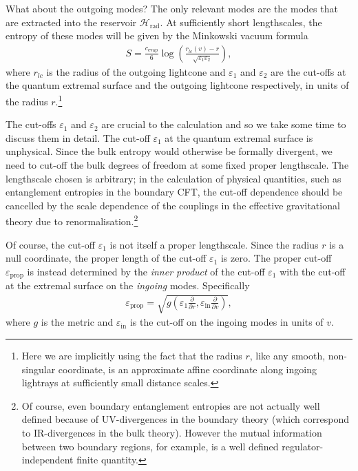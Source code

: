 \documentclass[12pt]{article}
\begin{document}
What about the outgoing modes? The only relevant modes are the modes that are extracted into the reservoir $\mathcal{H}_\text{rad}$. At sufficiently short lengthscales, the entropy of these modes will be given by the Minkowski vacuum formula \cite{calabrese2004entanglement, calabrese2009entanglement}
\begin{align} \label{eq:bulkentropyoutgoing}
S = \frac{c_\text{evap}}{6}\log\left(\frac{r_{lc}(v) - r}{\sqrt{\varepsilon_1 \varepsilon_2}}\right),
\end{align}
where $r_{lc}$ is the radius of the outgoing lightcone and $\varepsilon_1$ and $\varepsilon_2$ are the cut-offs at the quantum extremal surface and the outgoing lightcone respectively, in units of the radius $r$.\footnote{Here we are implicitly using the fact that the radius $r$, like any smooth, non-singular coordinate, is an approximate affine coordinate along ingoing lightrays at sufficiently small distance scales.}

The cut-offs $\varepsilon_1$ and $\varepsilon_2$ are crucial to the calculation and so we take some time to discuss them in detail. The cut-off $\varepsilon_1$ at the quantum extremal surface is unphysical. Since the bulk entropy would otherwise be formally divergent, we need to cut-off the bulk degrees of freedom at some fixed proper lengthscale. The lengthscale chosen is arbitrary; in the calculation of physical quantities, such as entanglement entropies in the boundary CFT, the cut-off dependence should be cancelled by the scale dependence of the couplings in the effective gravitational theory due to renormalisation.\footnote{Of course, even boundary entanglement entropies are not actually well defined because of UV-divergences in the boundary theory (which correspond to IR-divergences in the bulk theory). However the mutual information between two boundary regions, for example, is a well defined regulator-independent finite quantity.}

Of course, the cut-off $\varepsilon_1$ is not itself a proper lengthscale. Since the radius $r$ is a null coordinate, the proper length of the cut-off $\varepsilon_1$ is zero. The proper cut-off $\varepsilon_\text{prop}$ is instead determined by the \emph{inner product} of the cut-off $\varepsilon_1$ with the cut-off at the extremal surface on the \emph{ingoing} modes. Specifically
\begin{align}
\varepsilon_\text{prop} = \sqrt{g\left(\varepsilon_1 \frac{\partial}{\partial r}, \varepsilon_\text{in} \frac{\partial}{\partial v}\right)},
\end{align}
where $g$ is the metric and $\varepsilon_\text{in}$ is the cut-off on the ingoing modes in units of $v$.
\end{document}
